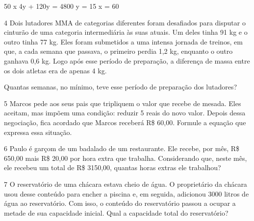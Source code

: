 \begin{escolha}
\begin{boxmedio}
\begin{boxmedio}
{\begin{boxpeq}
\begin{boxpeq}
{\begin{boxpeq}
\begin{boxmedio}
\begin{boxmedio}
\begin{boxpeq}
\begin{boxmedio}
\begin{boxpeq}
\begin{boxpeq}
\begin{boxpeq}
\begin{boxpeq}
\begin{boxmedio}
{\begin{boxmedio}
{50 x 4y + 120y = 4800 \rightarrow y = 15 \therefore x = 60}


\num{4} Dois lutadores MMA de categorias diferentes foram desafiados para
disputar o cinturão de uma categoria intermediária às suas atuais. Um
deles tinha 91 kg e o outro tinha 77 kg. Eles foram submetidos a uma
intensa jornada de treinos, em que, a cada semana que passava, o primeiro
perdia 1,2 kg, enquanto o outro ganhava 0,6 kg. Logo após esse período de
preparação, a diferença de massa entre os dois atletas era de apenas 4 kg.

Quantas semanas, no mínimo, teve esse período de preparação dos
lutadores?

\begin{boxmedio}

\num{5} Marcos pede aos seus pais que tripliquem o valor que recebe de mesada.
Eles aceitam, mas impõem uma condição: reduzir 5 reais do novo valor. Depois 
dessa negociação, fica acordado que Marcos receberá R\$ 60,00. 
Formule a equação que expressa essa situação.

\begin{boxpeq}

\num{6} Paulo é garçom de um badalado de um restaurante. Ele recebe, por mês,
R\$ 650,00 mais R\$ 20,00 por hora extra que trabalha. Considerando que,
neste mês, ele recebeu um total de R\$ 3150,00, quantas horas extras ele 
trabalhou?



\num{7} O reservatório de uma chácara estava cheio de água. O proprietário 
da chácara usou  desse conteúdo para encher a piscina e, em seguida,
adicionou 3000 litros de água ao reservatório. Com isso, o conteúdo do
reservatório passou a ocupar a metade de sua capacidade inicial. Qual a
capacidade total do reservatório?

\begin{boxmedio}


\end{boxmedio}
\end{boxpeq}
\end{boxmedio}
\end{boxmedio}}
\end{boxmedio}
\end{boxpeq}
\end{boxpeq}
\end{boxpeq}
\end{boxpeq}
\end{boxmedio}
\end{boxpeq}
\end{boxmedio}
\end{boxmedio}
\end{boxpeq}}
\end{boxpeq}
\end{boxpeq}}
\end{boxmedio}
\end{boxmedio}
\end{escolha}
